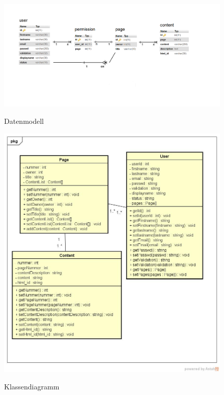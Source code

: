 \documentclass[10pt]{scrarticle}
\begin{document}

\begin{figure}[h]
\caption{Datenmodell}
\includegraphics[width=\textwidth]{DatenmodellEPortfolio}
\label{fig:datenmodell}
\end{figure}

\begin{figure}[h]
\caption{Klassendiagramm}
\includegraphics[width=\textwidth]{ClassDiagram}
\label{fig:classdiagram}
\end{figure}
\end{document}
